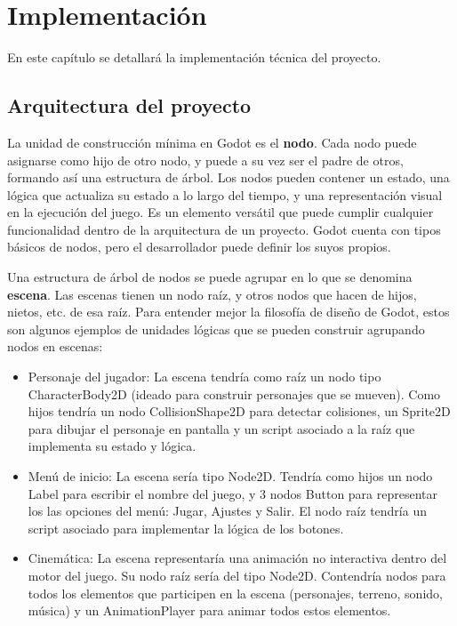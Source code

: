 \chapter{Implementación}
\label{chap:implementation}

En este capítulo se detallará la implementación técnica del proyecto.

\section{Arquitectura del proyecto}

La unidad de construcción mínima en Godot es el \textbf{nodo}. Cada nodo puede asignarse como hijo de otro nodo, y puede a su vez ser el padre de otros, formando así una estructura de árbol. Los nodos pueden contener un estado, una lógica que actualiza su estado a lo largo del tiempo, y una representación visual en la ejecución del juego. Es un elemento versátil que puede cumplir cualquier funcionalidad dentro de la arquitectura de un proyecto. Godot cuenta con tipos básicos de nodos, pero el desarrollador puede definir los suyos propios.

Una estructura de árbol de nodos se puede agrupar en lo que se denomina \textbf{escena}. Las escenas tienen un nodo raíz, y otros nodos que hacen de hijos, nietos, etc. de esa raíz. Para entender mejor la filosofía de diseño de Godot, estos son algunos ejemplos de unidades lógicas que se pueden construir agrupando nodos en escenas:

\begin{itemize}
    \item Personaje del jugador: La escena tendría como raíz un nodo tipo CharacterBody2D (ideado para construir personajes que se mueven). Como hijos tendría un nodo CollisionShape2D para detectar colisiones, un Sprite2D para dibujar el personaje en pantalla y un script asociado a la raíz que implementa su estado y lógica.
    \item Menú de inicio: La escena sería tipo Node2D. Tendría como hijos un nodo Label para escribir el nombre del juego, y 3 nodos Button para representar los las opciones del menú: Jugar, Ajustes y Salir. El nodo raíz tendría un script asociado para implementar la lógica de los botones.
    \item Cinemática: La escena representaría una animación no interactiva dentro del motor del juego. Su nodo raíz sería del tipo Node2D. Contendría nodos para todos los elementos que participen en la escena (personajes, terreno, sonido, música) y un AnimationPlayer para animar todos estos elementos.
\end{itemize}

